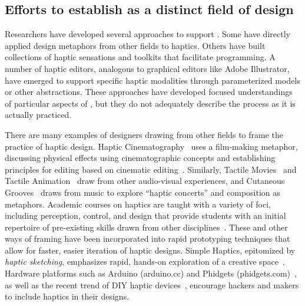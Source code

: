 \subsection{Efforts to establish \haxd as a distinct field of design}
\noindent
Researchers have developed several approaches to support \haxd.
Some have directly applied design metaphors from other fields to haptics.
Others have built collections of haptic sensations and toolkits that facilitate programming.
A number of haptic editors, analogous to graphical editors like Adobe Illustrator, have emerged to support specific haptic modalities through parameterized models or other abstractions.
These approaches have developed focused understandings of particular aspects of \haxd, but they do not adequately describe the process as it is actually practiced.

There are many examples of designers drawing from other fields to frame the practice of haptic design.
Haptic Cinematography~\citep{Danieau2014} uses a film-making metaphor, discussing physical effects using cinematographic concepts and establishing principles for editing based on cinematic editing~\citep{Guillotel2016}.
Similarly, 
Tactile Movies~\citep{Kim2009} and
Tactile Animation~\citep{Schneider2015}  
draw from other audio-visual experiences, and Cutaneous Grooves~\citep{Gunther2002} draws from music to explore ``haptic concerts'' and composition as metaphors.
Academic courses on haptics are taught with a variety of foci, including perception, control, and design that provide students with an initial repertoire of pre-existing skills drawn from other disciplines~\citep{Okamura2012,Jones2014}.
These and other ways of framing \haxd{} have been incorporated into rapid prototyping techniques that allow for faster, easier iteration of haptic designs.
Simple Haptics, epitomized by \emph{haptic sketching}, emphasizes rapid, hands-on exploration of a creative space~\citep{Moussette2010,Moussette2011}. %
Hardware platforms such as Arduino (arduino.cc) and Phidgets (phidgets.com)~\citep{Greenberg2001}, as well as the recent trend of DIY haptic devices~\citep{Martinez2016,Gallacher2016,Forsslund2015}, encourage hackers and makers to include haptics in their designs.


